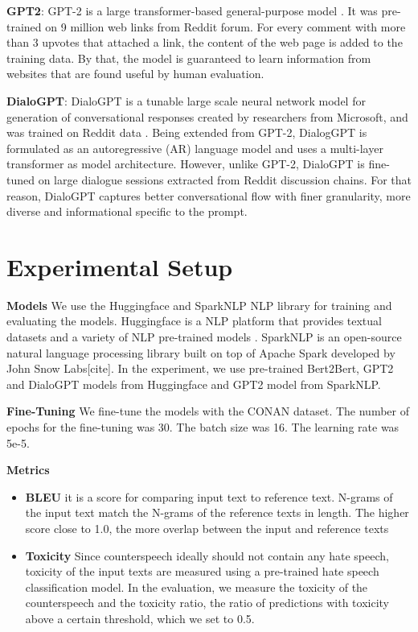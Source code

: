 \documentclass[10pt,twocolumn]{article}
\begin{document}
\textbf{GPT2}: GPT-2 is a large transformer-based general-purpose model \cite{radford2019language}. It was pre-trained on 9 million web links from Reddit forum.
For every comment with more than 3 upvotes that attached a link, the content of the web page is added to the training data. By that, the model is guaranteed to learn information from websites that are found useful by human evaluation.

\textbf{DialoGPT}: DialoGPT is a tunable large scale neural network model for generation of
conversational responses created by researchers from Microsoft,
and was trained on Reddit data \cite{zhang2019dialogpt}. Being extended from GPT-2, DialogGPT is formulated
as an autoregressive (AR) language model and uses a multi-layer transformer as model architecture.
However, unlike GPT-2, DialoGPT is fine-tuned on large dialogue sessions extracted from Reddit discussion chains.
For that reason, DialoGPT captures better conversational flow with finer granularity,
more diverse and informational specific to the prompt.


\section{Experimental Setup}

\noindent \textbf{Models}  We use the Huggingface and SparkNLP NLP library for training and evaluating the models.
Huggingface is a NLP platform that provides textual datasets and
a variety of NLP pre-trained models \cite{huggingfaceDialoGPT}.
SparkNLP is an open-source natural language processing library
built on top of Apache Spark developed by John Snow Labs[cite].
In the experiment, we use pre-trained Bert2Bert, GPT2 and DialoGPT
models from Huggingface and GPT2 model from SparkNLP.


\noindent \textbf{Fine-Tuning}  We fine-tune the models with the CONAN dataset.
The number of epochs for the fine-tuning was 30. The batch size was 16. The learning rate was 5e-5.


\noindent \textbf{Metrics}

\begin{itemize}
    \item \textbf{BLEU} \cite{papineni2002bleu} it is a score for comparing input text to reference text. N-grams of the input text match the N-grams of the reference texts in length. The higher score close to 1.0, the more overlap between the input and reference texts
    \item \textbf{Toxicity} \cite{gehman2020realtoxicityprompts} Since counterspeech ideally should not contain any hate speech, toxicity of the input texts are measured using a pre-trained hate speech classification model.
          In the evaluation, we measure the toxicity of the counterspeech and the toxicity ratio, the ratio of predictions with toxicity above a certain threshold, which we set to 0.5.
\end{itemize}
\end{document}
